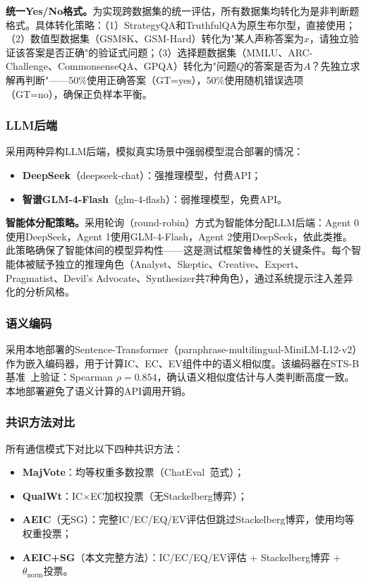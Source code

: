 \documentclass[12pt,a4paper,UTF8,fontset=fandol]{ctexart}
\begin{document}
\textbf{统一Yes/No格式。}为实现跨数据集的统一评估，所有数据集均转化为是非判断题格式。具体转化策略：（1）StrategyQA和TruthfulQA为原生布尔型，直接使用；（2）数值型数据集（GSM8K、GSM-Hard）转化为"某人声称答案为$x$，请独立验证该答案是否正确"的验证式问题；（3）选择题数据集（MMLU、ARC-Challenge、CommonsenseQA、GPQA）转化为"问题$Q$的答案是否为$A$？先独立求解再判断"——50\%使用正确答案（GT=yes），50\%使用随机错误选项（GT=no），确保正负样本平衡。

\subsubsection{LLM后端}

采用两种异构LLM后端，模拟真实场景中强弱模型混合部署的情况：
\begin{itemize}[nosep]
    \item \textbf{DeepSeek}（deepseek-chat）：强推理模型，付费API；
    \item \textbf{智谱GLM-4-Flash}（glm-4-flash）：弱推理模型，免费API。
\end{itemize}

\textbf{智能体分配策略。}采用轮询（round-robin）方式为智能体分配LLM后端：Agent 0使用DeepSeek，Agent 1使用GLM-4-Flash，Agent 2使用DeepSeek，依此类推。此策略确保了智能体间的模型异构性——这是测试框架鲁棒性的关键条件。每个智能体被赋予独立的推理角色（Analyst、Skeptic、Creative、Expert、Pragmatist、Devil's Advocate、Synthesizer共7种角色），通过系统提示注入差异化的分析风格。

\subsubsection{语义编码}

采用本地部署的Sentence-Transformer（paraphrase-multilingual-MiniLM-L12-v2）作为嵌入编码器，用于计算IC、EC、EV组件中的语义相似度。该编码器在STS-B基准~\cite{reimers2019sentence}上验证：Spearman $\rho = 0.854$，确认语义相似度估计与人类判断高度一致。本地部署避免了语义计算的API调用开销。

\subsubsection{共识方法对比}

所有通信模式下对比以下四种共识方法：
\begin{itemize}[nosep]
    \item \textbf{MajVote}：均等权重多数投票（ChatEval~\cite{chan2023chateval}范式）；
    \item \textbf{QualWt}：IC$\times$EC加权投票（无Stackelberg博弈）；
    \item \textbf{AEIC}（无SG）：完整IC/EC/EQ/EV评估但跳过Stackelberg博弈，使用均等权重投票；
    \item \textbf{AEIC+SG}（本文完整方法）：IC/EC/EQ/EV评估 + Stackelberg博弈 + $\theta_{\text{norm}}$投票。
\end{itemize}
\end{document}

